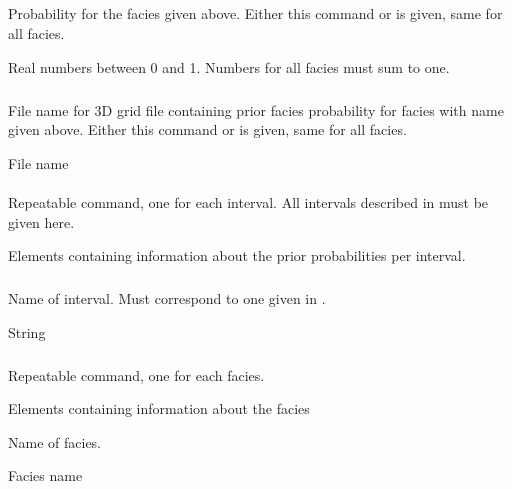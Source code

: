 {\subparagraph{}
 \slist
   \item \Description Probability for the facies given above. Either this command or  is given, same for all facies.
   \item \Argument Real numbers between 0 and 1. Numbers for all facies must sum to one.
   \item \Default
 \elist

\subparagraph{}
 \slist
   \item \Description File name for 3D grid file containing prior facies
     probability for facies with name given above. Either this command
     or  is given, same for all facies.
   \item \Argument File name
   \item \Default
 \elist

\paragraph{}
 \slist
   \item \Description Repeatable command, one for each interval. All intervals described in  must be given here.
   \item \Argument Elements containing information about the prior probabilities per interval.
   \item \Default
 \elist
 
\subparagraph{}
 \slist
   \item \Description Name of interval. Must correspond to one given in .
   \item \Argument String
   \item \Default
 \elist

\subparagraph{}
 \slist
   \item \Description Repeatable command, one for each facies. 
   \item \Argument Elements containing information about the facies
   \item \Default
 \elist

 \slist
   \item \Description Name of facies.
   \item \Argument Facies name
   \item \Default
 \elist

}
